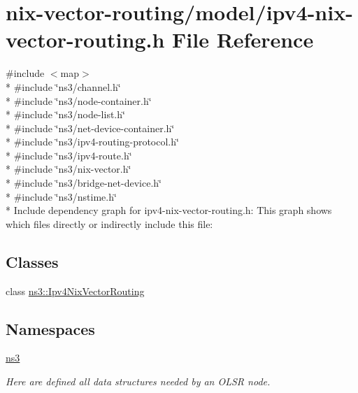 \hypertarget{ipv4-nix-vector-routing_8h}{}\section{nix-\/vector-\/routing/model/ipv4-\/nix-\/vector-\/routing.h File Reference}
\label{ipv4-nix-vector-routing_8h}
{\ttfamily \#include $<$map$>$}\\*
{\ttfamily \#include \char`\"{}ns3/channel.\+h\char`\"{}}\\*
{\ttfamily \#include \char`\"{}ns3/node-\/container.\+h\char`\"{}}\\*
{\ttfamily \#include \char`\"{}ns3/node-\/list.\+h\char`\"{}}\\*
{\ttfamily \#include \char`\"{}ns3/net-\/device-\/container.\+h\char`\"{}}\\*
{\ttfamily \#include \char`\"{}ns3/ipv4-\/routing-\/protocol.\+h\char`\"{}}\\*
{\ttfamily \#include \char`\"{}ns3/ipv4-\/route.\+h\char`\"{}}\\*
{\ttfamily \#include \char`\"{}ns3/nix-\/vector.\+h\char`\"{}}\\*
{\ttfamily \#include \char`\"{}ns3/bridge-\/net-\/device.\+h\char`\"{}}\\*
{\ttfamily \#include \char`\"{}ns3/nstime.\+h\char`\"{}}\\*
Include dependency graph for ipv4-\/nix-\/vector-\/routing.h\+:
This graph shows which files directly or indirectly include this file\+:
\subsection*{Classes}
\begin{DoxyCompactItemize}
\item 
class \hyperlink{classns3_1_1Ipv4NixVectorRouting}{ns3\+::\+Ipv4\+Nix\+Vector\+Routing}
\end{DoxyCompactItemize}
\subsection*{Namespaces}
\begin{DoxyCompactItemize}
\item 
 \hyperlink{namespacens3}{ns3}
\begin{DoxyCompactList}\small\item\em Here are defined all data structures needed by an O\+L\+SR node. \end{DoxyCompactList}\end{DoxyCompactItemize}
